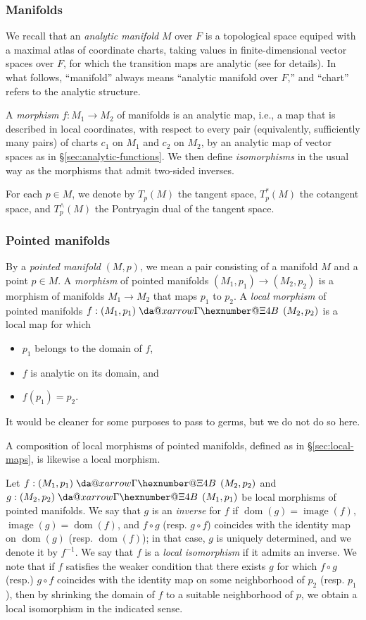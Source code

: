 \documentclass[reqno]{amsart}
\makeatletter
\newcommand*{\da@rightarrow}{\mathchar"0\hexnumber@\symAMSa 4B }
\newcommand*{\xdashrightarrow}[2][]{%
  \mathrel{%
    \mathpalette{\da@xarrow{#1}{#2}{}\da@rightarrow{\,}{}}{}%
  }%
}
\newcommand*{\da@xarrow}[7]{%
  \sbox0{$\ifx#7\scriptstyle\scriptscriptstyle\else\scriptstyle\fi#5#1#6\m@th$}%
  \sbox2{$\ifx#7\scriptstyle\scriptscriptstyle\else\scriptstyle\fi#5#2#6\m@th$}%
  \sbox4{$#7\dabar@\m@th$}%
  \dimen@=\wd0 %
  \ifdim\wd2 >\dimen@
    \dimen@=\wd2 %
  \fi
  \count@=2 %
  \def\da@bars{\dabar@\dabar@}%
  \@whiledim\count@\wd4<\dimen@\do{%
    \advance\count@\@ne
    \expandafter\def\expandafter\da@bars\expandafter{%
      \da@bars
      \dabar@ 
    }%
  }%
  \mathrel{#3}%
  \mathrel{%
    \mathop{\da@bars}\limits
    \ifx\\#1\\%
    \else
      _{\copy0}%
    \fi
    \ifx\\#2\\%
    \else
      ^{\copy2}%
    \fi
  }%
  \mathrel{#4}%
}
\DeclareMathOperator{\image}{image}
\DeclareMathOperator{\dom}{dom}
\theoremstyle{plain} \newtheorem{theorem} {Theorem}
\theoremstyle{definition} \newtheorem{definition} [theorem] {Definition}
\theoremstyle{itplain} %
\numberwithin{equation}{section}
\numberwithin{theorem}{section}
\makeatother
\begin{document}
\subsubsection{Manifolds}\label{sec:manifolds}
We recall that an \emph{analytic manifold} $M$ over $F$ is a topological space equiped with a maximal atlas of coordinate charts, taking values in finite-dimensional vector spaces over $F$, for which the  transition maps are analytic (see \cite[Part II, Chapter III]{MR2179691} for details).  In what follows, ``manifold'' always means ``analytic manifold over $F$,'' and ``chart'' refers to the analytic structure.

A \emph{morphism} $f : M_1 \rightarrow M_2$ of manifolds is an analytic map, i.e., a map that is described in local coordinates, with respect to every pair (equivalently, sufficiently many pairs) of charts $c_1$ on $M_1$ and $c_2$ on $M_2$, by an analytic map of vector spaces as in \S\ref{sec:analytic-functions}.  We then define \emph{isomorphisms} in the usual way as the morphisms that admit two-sided inverses.


For each $p \in M$, we denote by $T_p(M)$ the tangent space, $T_p^*(M)$ the cotangent space, and $T_p^\wedge(M)$ the Pontryagin dual of the tangent space.


\subsubsection{Pointed manifolds}\label{sec:pointed-manifolds}
By a \emph{pointed manifold} $(M,p)$, we mean a pair consisting of a manifold $M$ and a point $p \in M$.  A \emph{morphism} of pointed manifolds $(M_1, p_1) \rightarrow (M_2, p_2)$ is a morphism of manifolds $M_1 \rightarrow M_2$ that maps $p_1$ to $p_2$.  A \emph{local morphism} of pointed manifolds $f : (M_1,p_1) \xdashrightarrow{} (M_2,p_2)$ is a local map for which
\begin{itemize}
\item $p_1$ belongs to the domain of $f$,
\item $f$ is analytic on its domain, and
\item $f(p_1) = p_2$.
\end{itemize}
It would be cleaner for some purposes to pass to germs, but we do not do so here.

A composition of local morphisms of pointed manifolds, defined as in \S\ref{sec:local-maps}, is likewise a local morphism.

Let $f : (M_1,p_1) \xdashrightarrow{} (M_2,p_2)$ and $g : (M_2,p_2) \xdashrightarrow{} (M_1,p_1)$ be local morphisms of pointed manifolds.  We say that $g$ is an \emph{inverse} for $f$ if $\dom(g) = \image(f)$, $\image(g) = \dom(f)$, and $f \circ g$ (resp. $g \circ f$) coincides with the identity map on $\dom(g)$ (resp. $\dom(f)$); in that case, $g$ is uniquely determined, and we denote it by $f^{-1}$.  We say that $f$ is a \emph{local isomorphism} if it admits an inverse.  We note that if $f$ satisfies the weaker condition that there exists $g$ for which $f \circ g$ (resp.) $g \circ f$ coincides with the identity map on some neighborhood of $p_2$ (resp. $p_1$), then by shrinking the domain of $f$ to a suitable neighborhood of $p$, we obtain a local isomorphism in the indicated sense.
\end{document}
